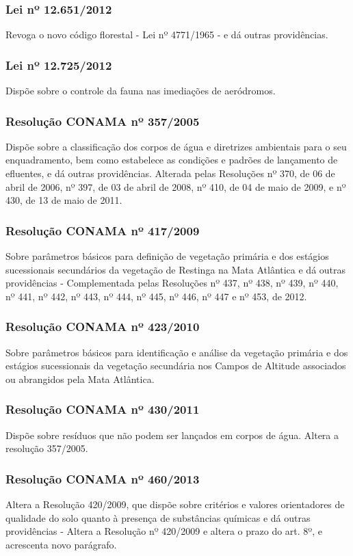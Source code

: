 \begin{subapend}
\begin{subsubapend}
		\subsubsection{Lei nº 12.651/2012}
		Revoga o novo código florestal - Lei nº 4771/1965 -  e dá outras providências.
		\subsubsection{Lei nº 12.725/2012}
		Dispõe sobre o controle da fauna nas imediações de aeródromos.
		\subsubsection{Resolução CONAMA nº 357/2005}
		Dispõe sobre a classificação dos corpos de água e diretrizes ambientais para o seu enquadramento, bem como estabelece as condições e padrões de lançamento de efluentes, e dá outras providências. Alterada pelas Resoluções nº 370, de 06 de abril de 2006, nº 397, de 03 de abril de 2008, nº 410, de 04 de maio de 2009, e nº 430, de 13 de maio de 2011.
		\subsubsection{Resolução CONAMA nº 417/2009}
		Sobre parâmetros básicos para definição de vegetação primária e dos estágios sucessionais secundários da vegetação de Restinga na Mata Atlântica e dá outras providências - Complementada pelas Resoluções nº 437, nº 438, nº 439, nº 440, nº 441, nº 442, nº 443, nº 444, nº 445, nº 446, nº 447 e nº 453, de 2012.
		\subsubsection{Resolução CONAMA nº 423/2010}
		Sobre parâmetros básicos para identificação e análise da vegetação primária e dos estágios sucessionais da vegetação secundária nos Campos de Altitude associados ou abrangidos pela Mata Atlântica.
		\subsubsection{Resolução CONAMA nº 430/2011}
		Dispõe sobre resíduos que não podem ser lançados em corpos de água.  Altera a resolução 357/2005.
		\subsubsection{Resolução CONAMA nº 460/2013}
		Altera a Resolução 420/2009, que dispõe sobre critérios e valores orientadores de qualidade do solo quanto à presença de substâncias químicas e dá outras providências - Altera a Resolução  nº 420/2009 e altera o prazo do art. 8º, e acrescenta novo parágrafo.

\end{subsubapend}
\end{subapend}
